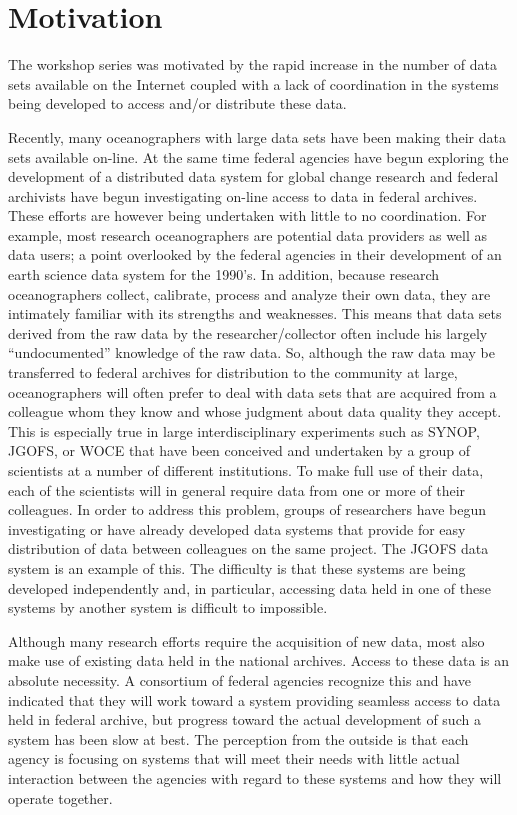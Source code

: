 \section{\bf Motivation}

The workshop series was motivated by the rapid increase in the number of 
data sets available on the Internet coupled with a lack of coordination 
in the systems being developed to access and/or distribute these data.

Recently, many oceanographers with large data sets have been making 
their data sets available on-line. At the same time federal agencies 
have begun exploring the development of a distributed data system for 
global change research and federal archivists have begun investigating 
on-line access to data in federal archives. These efforts are 
however being undertaken with little to no coordination. For example,
most research oceanographers are potential data providers as well as 
data users; a point overlooked by the federal agencies in their 
development of an earth science data system for the 1990's. In 
addition, because research oceanographers collect, calibrate, 
process and analyze their own data, they are intimately familiar with 
its strengths and weaknesses. This means that data sets derived from 
the raw data by the researcher/collector often include his largely 
``undocumented'' knowledge of the raw data. So, although the raw data 
may be transferred to federal archives for distribution to the 
community at large, oceanographers will often prefer to deal with data 
sets that are acquired from a colleague whom they know and whose judgment 
about data quality they accept. This is especially true in large 
interdisciplinary experiments such as SYNOP, JGOFS, or WOCE that have 
been conceived and undertaken by a group of scientists at a number of 
different institutions. To make full use of their data, each of the 
scientists will in general require data from one or more of their 
colleagues. In order to address this problem, groups of researchers 
have begun investigating or have already developed data systems that 
provide for easy distribution of data between colleagues on the same 
project. The JGOFS data system is an example of this. The difficulty 
is that these systems are being developed independently and, in 
particular, accessing data held in one of these systems by another 
system is difficult to impossible. 

Although many research efforts require the acquisition of new data, 
most also make use of existing data held in the national archives. 
Access to these data is an absolute necessity. A consortium of federal 
agencies recognize this and have indicated that they will work toward a 
system providing seamless access to data held in federal archive, but
progress toward the actual development of such a system has been slow at 
best. The perception from the outside is that each agency is focusing 
on systems that will meet their needs with little actual interaction 
between the agencies with regard to these systems and how they will 
operate together. 

